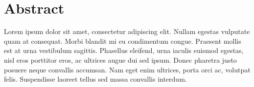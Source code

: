 \documentclass[../thesis.tex]{subfiles}
\begin{document}
\chapter*{Abstract}

Lorem ipsum dolor sit amet, consectetur adipiscing elit. Nullam egestas vulputate quam at consequat. Morbi blandit mi eu condimentum congue. Praesent mollis est at urna vestibulum sagittis. Phasellus eleifend, urna iaculis euismod egestas, nisl eros porttitor eros, ac ultrices augue dui sed ipsum. Donec pharetra justo posuere neque convallis accumsan. Nam eget enim ultrices, porta orci ac, volutpat felis. Suspendisse laoreet tellus sed massa convallis interdum.
\end{document}
